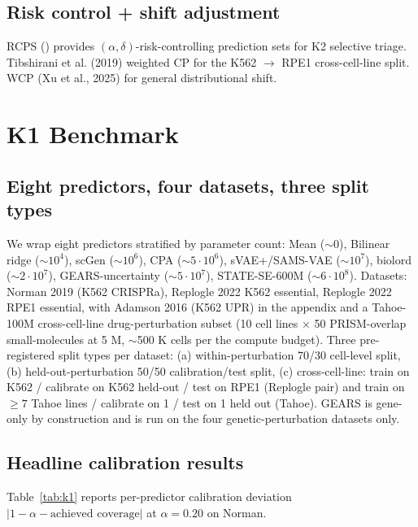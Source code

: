 \documentclass{article}
\begin{document}
\subsection{Risk control + shift adjustment}
RCPS (\citet{bates2021}) provides $(\alpha, \delta)$-risk-controlling prediction sets for K2 selective triage. Tibshirani et al. (2019) weighted CP for the K562 $\rightarrow$ RPE1 cross-cell-line split. WCP (Xu et al., 2025) for general distributional shift.

\section{K1 Benchmark}

\subsection{Eight predictors, four datasets, three split types}
We wrap eight predictors stratified by parameter count: Mean ($\sim 0$), Bilinear ridge ($\sim 10^4$), scGen ($\sim 10^6$), CPA ($\sim 5 \cdot 10^6$), sVAE+/SAMS-VAE ($\sim 10^7$), biolord ($\sim 2 \cdot 10^7$), GEARS-uncertainty ($\sim 5 \cdot 10^7$), STATE-SE-600M ($\sim 6 \cdot 10^8$). Datasets: Norman 2019 (K562 CRISPRa), Replogle 2022 K562 essential, Replogle 2022 RPE1 essential, with Adamson 2016 (K562 UPR) in the appendix and a Tahoe-100M \citep{tahoe2025} cross-cell-line drug-perturbation subset (10 cell lines $\times$ 50 PRISM-overlap small-molecules at 5 \textmu M, $\sim$500 K cells per the compute budget). Three pre-registered split types per dataset: (a) within-perturbation 70/30 cell-level split, (b) held-out-perturbation 50/50 calibration/test split, (c) cross-cell-line: train on K562 / calibrate on K562 held-out / test on RPE1 (Replogle pair) and train on $\geq 7$ Tahoe lines / calibrate on 1 / test on 1 held out (Tahoe). GEARS is gene-only by construction and is run on the four genetic-perturbation datasets only.

\subsection{Headline calibration results}
Table~\ref{tab:k1} reports per-predictor calibration deviation $|1 - \alpha - \text{achieved coverage}|$ at $\alpha = 0.20$ on Norman.
\end{document}

